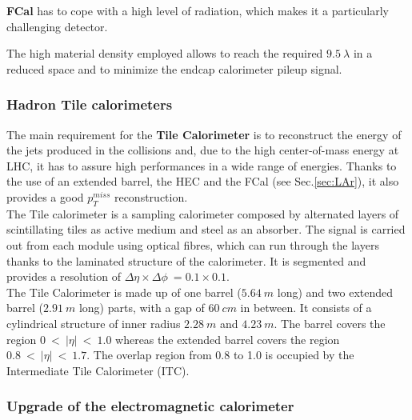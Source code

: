 \documentclass[a4paper,twoside,12pt]{article}
\begin{document}
\textbf{FCal} has to cope with a high level of radiation, which makes it a particularly challenging detector. 

 The high material density employed allows to reach the required $9.5\ \lambda$ in a reduced space and to minimize the endcap calorimeter pileup signal.  \\[2pt]

\subsubsection*{Hadron Tile calorimeters}
The main requirement for the \textbf{Tile Calorimeter} is to reconstruct the energy of the jets produced in the collisions and, due to the high center-of-mass energy at LHC, it has to assure 
high performances in a wide range of energies. Thanks to the use of an extended barrel, the HEC and the FCal (see Sec.\ref{sec:LAr}), it also provides a good $p_T^{miss}$ reconstruction.\\

The Tile calorimeter is a sampling calorimeter composed by alternated layers of scintillating tiles as active medium and steel as an absorber. The signal is carried out from each module using optical fibres, which can run through the layers thanks to the laminated structure of the calorimeter. It is segmented and provides a resolution of
$\Delta\eta \times \Delta\phi\ = 0.1 \times 0.1$.\\
The Tile Calorimeter is made up of one barrel ($5.64\ m$ long) and two extended barrel ($2.91\ m$ long) parts, with a gap of $60\ cm$ in between. It consists of a cylindrical structure of inner radius $2.28\ m$ and $4.23\ m$. The barrel covers the region $0\ <\ |\eta|\ <\ 1.0$ whereas the extended barrel covers the region $0.8\ <\ |\eta|\ <\ 1.7$. The overlap region from 0.8 to 1.0 is
occupied by the Intermediate Tile Calorimeter (ITC).\\

\subsubsection*{Upgrade of the electromagnetic calorimeter}
\end{document}

